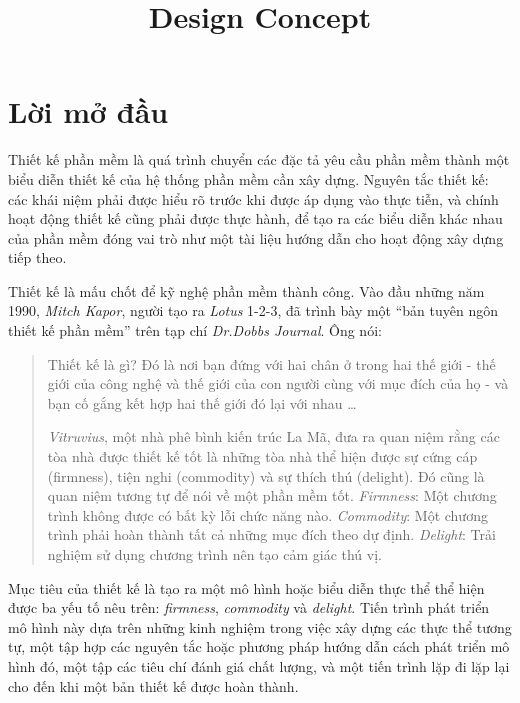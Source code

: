 \documentclass[12pt,a4paper,oneside]{article}
\title{Design Concept}
\begin{document}
	
	\clearpage
	
	\tableofcontents 
	\clearpage
	
	\listoffigures
	
	\listoftables
	
	\printglossary[type=\acronymtype, title=Thuật ngữ viết tắt]
	\clearpage
	
	\section*{Lời mở đầu}
	Thiết kế phần mềm là quá trình chuyển các đặc tả yêu cầu phần mềm thành một biểu diễn thiết kế của hệ thống phần mềm cần xây dựng. Nguyên tắc thiết kế: các khái niệm phải được hiểu rõ trước khi được áp dụng vào thực tiễn, và chính hoạt động thiết kế cũng phải được thực hành, để tạo ra các biểu diễn khác nhau của phần mềm đóng vai trò như một tài liệu hướng dẫn cho hoạt động xây dựng tiếp theo.
	
	
	
	Thiết kế là mấu chốt để kỹ nghệ phần mềm thành công. Vào đầu những năm 1990,\textit{ Mitch Kapor}, người tạo ra \textit{Lotus} 1-2-3, đã trình bày một “bản tuyên ngôn thiết kế phần mềm” trên tạp chí \textit{Dr.Dobbs Journal}. Ông nói:
	
	
	\begin{quotation}
	Thiết kế là gì? Đó là nơi bạn đứng với hai chân ở trong hai thế giới - thế giới của công nghệ và thế giới của con người  cùng với  mục đích của họ - và bạn cố gắng kết hợp hai thế giới đó lại với nhau \ldots
		
		
		\textit{Vitruvius}, một nhà phê bình kiến trúc La Mã, đưa ra quan niệm rằng các tòa nhà được thiết kế tốt là những tòa nhà thể hiện được sự cứng cáp (firmness), tiện nghi (commodity) và sự thích thú (delight). Đó cũng là quan niệm tương tự để nói về một phần mềm tốt.\textit{ Firmness}: Một chương trình không được có bất kỳ lỗi chức năng nào. \textit{Commodity}: Một chương trình phải hoàn thành tất cả những mục đích theo dự định. \textit{Delight}: Trải nghiệm sử dụng chương trình nên tạo cảm giác thú vị. 
		
	\end{quotation}	
	
	Mục tiêu của thiết kế là tạo ra một mô hình hoặc biểu diễn thực thể thể hiện được ba yếu tố nêu trên: \textit{firmness}, \textit{commodity} và \textit{delight}. Tiến trình phát triển mô hình này dựa trên những kinh nghiệm trong việc xây dựng các thực thể tương tự, một tập hợp các nguyên tắc hoặc phương pháp hướng dẫn cách phát triển mô hình đó, một tập các tiêu chí đánh giá chất lượng, và một tiến trình lặp đi lặp lại cho đến khi một bản thiết kế được hoàn thành.
	
\end{document}
